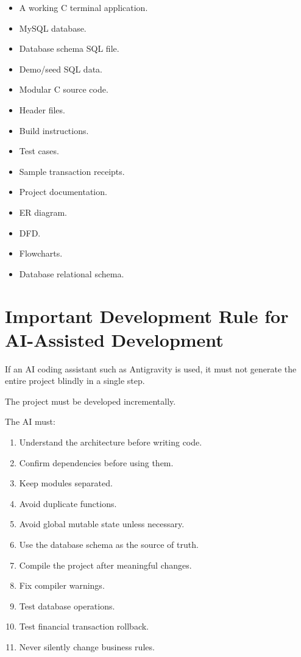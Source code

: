 \documentclass[12pt,a4paper]{article}
\begin{document}
\begin{itemize}
    \item A working C terminal application.
    \item MySQL database.
    \item Database schema SQL file.
    \item Demo/seed SQL data.
    \item Modular C source code.
    \item Header files.
    \item Build instructions.
    \item Test cases.
    \item Sample transaction receipts.
    \item Project documentation.
    \item ER diagram.
    \item DFD.
    \item Flowcharts.
    \item Database relational schema.
\end{itemize}


\section{Important Development Rule for AI-Assisted Development}

If an AI coding assistant such as Antigravity is used, it must not
generate the entire project blindly in a single step.

The project must be developed incrementally.

The AI must:

\begin{enumerate}
    \item Understand the architecture before writing code.
    \item Confirm dependencies before using them.
    \item Keep modules separated.
    \item Avoid duplicate functions.
    \item Avoid global mutable state unless necessary.
    \item Use the database schema as the source of truth.
    \item Compile the project after meaningful changes.
    \item Fix compiler warnings.
    \item Test database operations.
    \item Test financial transaction rollback.
    \item Never silently change business rules.
\end{enumerate}
\end{document}
